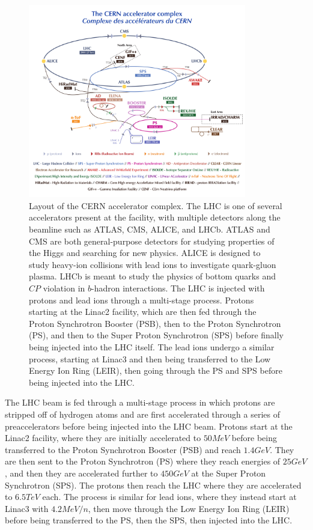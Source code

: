 \begin{figure}[htbp]
  \centering
  \includegraphics[width=0.85\textwidth]{fig/experiment/CCC-v2018-print-v2.pdf}
  \caption{Layout of the CERN accelerator complex. The LHC is one of several accelerators present at the facility, with multiple detectors along the beamline such as ATLAS, CMS, ALICE, and LHCb. ATLAS and CMS are both general-purpose detectors for studying properties of the Higgs and searching for new physics. ALICE is designed to study heavy-ion collisions with lead ions to investigate quark-gluon plasma. LHCb is meant to study the physics of bottom quarks and $CP$ violation in $b$-hadron interactions. The LHC is injected with protons and lead ions through a multi-stage process. Protons starting at the Linac2 facility, which are then fed through the Proton Synchrotron Booster (PSB), then to the Proton Synchrotron (PS), and then to the Super Proton Synchrotron (SPS) before finally being injected into the LHC itself. The lead ions undergo a similar process, starting at Linac3 and then being transferred to the Low Energy Ion Ring (LEIR), then going through the PS and SPS before being injected into the LHC.}
  \label{fig:CERN}
\end{figure}

The LHC beam is fed through a multi-stage process in which protons are stripped off of hydrogen atoms and are first accelerated through a series of preaccelerators before being injected into the LHC beam.
Protons start at the Linac2 facility, where they are initially accelerated to $50\unit{MeV}$ before being transferred to the Proton Synchrotron Booster (PSB) and reach $1.4\unit{GeV}$.
They are then sent to the Proton Synchrotron (PS) where they reach energies of $25\unit{GeV}$, and then they are accelerated further to $450\unit{GeV}$ at the Super Proton Synchrotron (SPS).
The protons then reach the LHC where they are accelerated to $6.5\unit{TeV}$ each.
The process is similar for lead ions, where they instead start at Linac3 with $4.2\unit{MeV/n}$, then move through the Low Energy Ion Ring (LEIR) before being transferred to the PS, then the SPS, then injected into the LHC.

